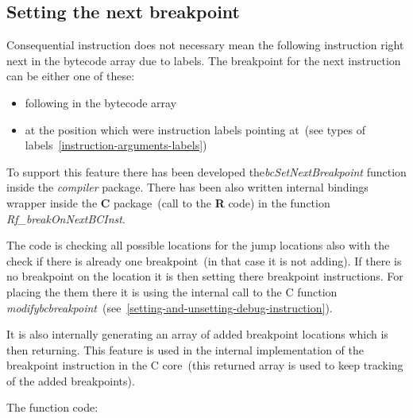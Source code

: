 \documentclass[thesis=M,english]{FITthesis}[2018/10/20]
\begin{document}
\subsection{Setting the next breakpoint}\label{setting-next-breakpoint}

Consequential instruction does not necessary mean the following instruction right next in the bytecode array due to labels. The breakpoint for the next instruction can be either one of these:

\begin{itemize}
	\item following in the bytecode array
	\item at the position which were instruction labels pointing at~(see types of labels~\ref{instruction-arguments-labels})
\end{itemize}

To support this feature there has been developed the\textit{bcSetNextBreakpoint} function inside the \textit{compiler} package. There has been also written internal bindings wrapper inside the \textbf{C} package~(call to the \textbf{R} code) in the function \textit{Rf{\_}breakOnNextBCInst}. 

The code is checking all possible locations for the jump locations also with the check if there is already one breakpoint~(in that case it is not adding). If there is no breakpoint on the location it is then setting there breakpoint instructions. For placing the them there it is using the internal call to the C function \textit{modifybcbreakpoint}~(see~\ref{setting-and-unsetting-debug-instruction}).

It is also internally generating an array of added breakpoint locations which is then returning. This feature is used in the internal implementation of the breakpoint instruction in the C core~(this returned array is used to keep tracking of the added breakpoints).

The function code:
\end{document}
